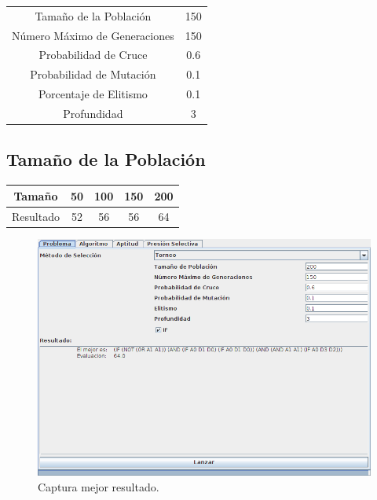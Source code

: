 \documentclass[12pt]{article}
\begin{document}
\begin{table}[H]
\begin{center}
\begin{tabular}{|cc|} \hline
Tamaño de la Población   & 150  \\  
Número Máximo de Generaciones  &  150 \\
Probabilidad de Cruce & 0.6 \\
Probabilidad de Mutación & 0.1 \\
Porcentaje de Elitismo & 0.1 \\
Profundidad & 3 \\ \hline
\end{tabular}
\end{center}
\end{table}


\subsection{Tamaño de la Población}

\begin{table}[H]
\begin{center}
\begin{tabular}{|ccccc|} \hline
Tamaño	   & 50 & 100 & 150 & 200 \\  \hline
Resultado  & 52  & 56 &  56 &  64\\ \hline
\end{tabular}
\end{center}
\end{table}

\begin{figure}[H]
\centering
\includegraphics[scale=0.4]{graficas/tp64}
\caption{Captura mejor resultado.}
\end{figure}
\end{document}
